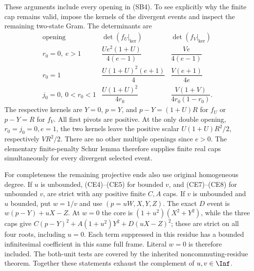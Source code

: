 These arguments include every opening in (SB4). To see explicitly
why the finite cap remains valid, impose the kernels of the divergent
events and inspect the remaining two-state Gram. The determinants
are
\[
\renewcommand{\arraystretch}{1.7}
\begin{array}{c|c|c}
\text{opening}&\det(f_U|_{\ker})&\det(f_V|_{\ker})\\\hline
r_0=0,\ e>1&\dfrac{Ue^2(1+U)}{4(e-1)}&\dfrac{Ve}{4(e-1)}\\
r_0=1&\dfrac{U(1+U)^2(e+1)}4&\dfrac{V(e+1)}{4e}\\
j_0=0,\ 0<r_0<1&
 \dfrac{U(1+U)^2}{4r_0}&\dfrac{V(1+V)}{4r_0(1-r_0)}.
\end{array}                                                   \tag{SB10}
\]
The respective kernels are $Y=0$, $p=Y$, and
$p-Y=(1+U)R$ for $f_U$ or $p-Y=R$ for $f_V$.
All first pivots are positive. At the only double opening,
$r_0=j_0=0,e=1$, the two kernels leave the positive scalar
$U(1+U)R^2/2$, respectively $VR^2/2$. There are no other
multiple openings since $e>0$. The elementary finite-penalty
Schur lemma therefore supplies finite real caps simultaneously
for every divergent selected event.

For completeness the remaining projective ends also use original
homogeneous degree. If $u$ is unbounded, (CE4)--(CE5) for bounded
$v$, and (CE7)--(CE8) for unbounded $v$, are strict with any positive
finite $C,A$ caps. If $v$ is unbounded and $u$ bounded, put
$w=1/v$ and use $(p=uW,X,Y,Z)$. The exact $D$ event is
$w(p-Y)+uX-Z$. At $w=0$ the core is
$(1+u^2)(X^2+Y^2)$, while the three caps give
$C(p-Y)^2+A(1+u^2)Y^2+D(uX-Z)^2$; these are strict on
all four roots, including $u=0$. Each term suppressed in this
residue has a bounded infinitesimal coefficient in this same
full frame. Literal $w=0$ is therefore included. The both-unit
tests are covered by the inherited noncommuting-residue theorem.
Together these statements exhaust the complement of $u,v\in\Inf$.

